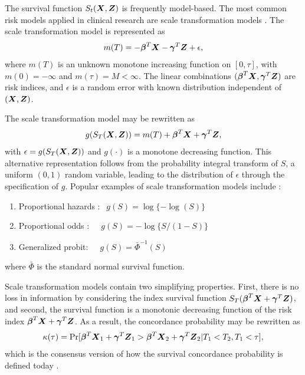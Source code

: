 \documentclass[12pt]{article}
\newcommand{\bmX}{\mbox{\boldmath $X$}}
\newcommand{\bg}{\mbox{\boldmath $\gamma$}}
\newcommand{\bb}{\mbox{\boldmath $\beta$}}
\newcommand{\bmZ}{\mbox{\boldmath $Z$}}
\begin{document}
The survival function $S_t(\bmX, \bmZ)$ is frequently model-based.
The most common risk models applied in clinical research are scale transformation models \citep{Cheng1995}. The scale transformation model is represented as
\[ m(T) = -\bb^T \bmX - \bg^T \bmZ + \epsilon , \]
where $m(T)$ is an unknown monotone increasing function on $[0,\tau]$, with $m(0)= -\infty$ and $m(\tau) = M < \infty$. The linear combinations  $(\bb^T\bmX, \bg^T \bmZ)$ are risk indices, and $\epsilon$ is a random error with known distribution independent of $(\bmX, \bmZ)$.

The scale transformation model may be rewritten as 
\[ g(S_T(\bmX, \bmZ)) = m(T) +\bb^T \bmX + \bg^T \bmZ ,\] 
with $\epsilon = g(S_T(\bmX, \bmZ))$ and $g(\cdot)$ is a monotone decreasing function. 
This alternative representation follows from the probability integral transform of $S$, a uniform $(0,1)$ random variable, leading to the distribution of  $\epsilon$  through the specification of $g$. Popular examples of scale transformation models include \citep{Dabrowska1988}:
\begin{enumerate}
    \item Proportional hazards : $ \ \ g(S) = \log\{- \log(S)\} $
    \item Proportional odds :  $ \ \ \ \ \ g(S) = - \log\{S/(1-S)\} $
    \item Generalized probit: $ \ \ \ \ \ g(S) = \bar{\Phi}^{-1}(S)$
\end{enumerate}
where $\bar{\Phi}$ is the standard normal survival function.

Scale transformation models contain two simplifying properties. First, there is no loss in information by considering the index survival function $S_T(\bb^T \bmX + \bg^T \bmZ)$, and second, the survival function is a monotonic decreasing function of the risk index $\bb^T \bmX + \bg^T \bmZ$. As a result, the concordance probability may be rewritten as 
\begin{equation} \kappa(\tau) = \mbox{Pr}[\bb^T\bmX_1 + \bg^T\bmZ_1 >  \bb^T\bmX_2 + \bg^T\bmZ_2 | T_1 < T_2, T_1 < \tau] ,\end{equation}
which is the consensus version of how the survival concordance probability is defined today \citep{Uno2011}. 
\end{document}
